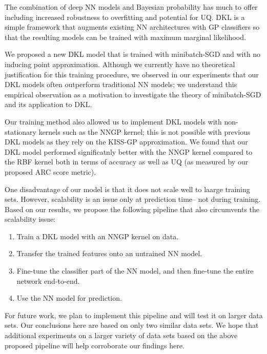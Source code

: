 \documentclass{article}
\begin{document}
The combination of deep NN models and Bayesian probability has much to offer including increased robustness to overfitting and potential for UQ. DKL is a simple framework that augments existing NN architectures with GP classifiers so that the resulting models can be trained with maximum marginal likelihood.

We proposed a new DKL model that is trained with minibatch-SGD and with no inducing point approximation. Although we currently have no theoretical justification for this training procedure, we observed in our experiments that our DKL models often outperform traditional NN models; we understand this empirical observation as a motivation to investigate the theory of minibatch-SGD and its application to DKL.

Our training method also allowed us to implement DKL models with non-stationary kernels such as the NNGP kernel; this is not possible with previous DKL models as they rely on the KISS-GP approximation. We found that our DKL model performed significatnly better with the NNGP kernel compared to the RBF kernel both in terms of accuracy as well as UQ (as measured by our  proposed ARC score metric).

One disadvantage of our model is that it does not scale well to laarge training sets. However, scalability is an issue only at prediction time-- not during training. Based on our results, we propose the following pipeline that also circumvents the scalability issue:
\begin{enumerate}
\item Train a DKL model with an NNGP kernel on data.
\item Transfer the trained features onto an untrained NN model.
\item Fine-tune the classifier part of the NN model, and then fine-tune the entire network end-to-end.
\item Use the NN model for prediction.
\end{enumerate}
For future work, we plan to implement this pipeline and will test it on larger data sets. Our conclusions here are based on only two similar data sets. We hope that additional experiments on a larger variety of data sets based on the above proposed pipeline will help corroborate our findings here.



\end{document}

